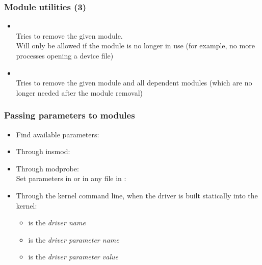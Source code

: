 \begin{frame}
  \frametitle{Module utilities (3)}
  \begin{itemize}
  \item {}\\
    Tries to remove the given module.\\
    Will only be allowed if the module is no longer in use (for
    example, no more processes opening a device file)
  \item {}\\
    Tries to remove the given module and all dependent modules (which
    are no longer needed after the module removal)
  \end{itemize}
\end{frame}

\begin{frame}
  \frametitle{Passing parameters to modules}
  \begin{itemize}
  \item Find available parameters:\\
  \item Through insmod:\\
  \item Through modprobe:\\
    Set parameters in  or in any file in :\\
  \item Through the kernel command line, when the driver is built statically into the kernel:\\
    \begin{itemize}
    \item {} is the {\em driver name}
    \item {} is the {\em driver parameter name}
    \item {} is the {\em driver parameter value}
    \end{itemize}
  \end{itemize}
\end{frame}

